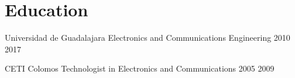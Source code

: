 
\section{Education}

\eduitem
    {Universidad de Guadalajara}
    {Electronics and Communications Engineering}
    {2010}
    {2017}


\eduitem
    {CETI Colomos}
    {Technologist in Electronics and Communications}
    {2005}
    {2009}
